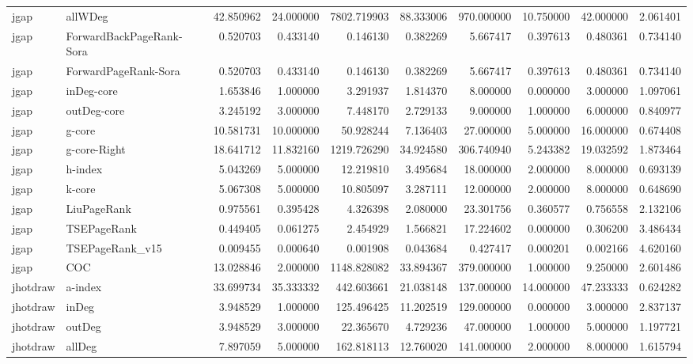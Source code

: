 \begin{tabular}{llrrrrrrrr}
jgap & allWDeg & 42.850962 & 24.000000 & 7802.719903 & 88.333006 & 970.000000 & 10.750000 & 42.000000 & 2.061401 \\
jgap & ForwardBackPageRank-Sora & 0.520703 & 0.433140 & 0.146130 & 0.382269 & 5.667417 & 0.397613 & 0.480361 & 0.734140 \\
jgap & ForwardPageRank-Sora & 0.520703 & 0.433140 & 0.146130 & 0.382269 & 5.667417 & 0.397613 & 0.480361 & 0.734140 \\
jgap & inDeg-core & 1.653846 & 1.000000 & 3.291937 & 1.814370 & 8.000000 & 0.000000 & 3.000000 & 1.097061 \\
jgap & outDeg-core & 3.245192 & 3.000000 & 7.448170 & 2.729133 & 9.000000 & 1.000000 & 6.000000 & 0.840977 \\
jgap & g-core & 10.581731 & 10.000000 & 50.928244 & 7.136403 & 27.000000 & 5.000000 & 16.000000 & 0.674408 \\
jgap & g-core-Right & 18.641712 & 11.832160 & 1219.726290 & 34.924580 & 306.740940 & 5.243382 & 19.032592 & 1.873464 \\
jgap & h-index & 5.043269 & 5.000000 & 12.219810 & 3.495684 & 18.000000 & 2.000000 & 8.000000 & 0.693139 \\
jgap & k-core & 5.067308 & 5.000000 & 10.805097 & 3.287111 & 12.000000 & 2.000000 & 8.000000 & 0.648690 \\
jgap & LiuPageRank & 0.975561 & 0.395428 & 4.326398 & 2.080000 & 23.301756 & 0.360577 & 0.756558 & 2.132106 \\
jgap & TSEPageRank & 0.449405 & 0.061275 & 2.454929 & 1.566821 & 17.224602 & 0.000000 & 0.306200 & 3.486434 \\
jgap & TSEPageRank_v15 & 0.009455 & 0.000640 & 0.001908 & 0.043684 & 0.427417 & 0.000201 & 0.002166 & 4.620160 \\
jgap & COC & 13.028846 & 2.000000 & 1148.828082 & 33.894367 & 379.000000 & 1.000000 & 9.250000 & 2.601486 \\
jhotdraw & a-index & 33.699734 & 35.333332 & 442.603661 & 21.038148 & 137.000000 & 14.000000 & 47.233333 & 0.624282 \\
jhotdraw & inDeg & 3.948529 & 1.000000 & 125.496425 & 11.202519 & 129.000000 & 0.000000 & 3.000000 & 2.837137 \\
jhotdraw & outDeg & 3.948529 & 3.000000 & 22.365670 & 4.729236 & 47.000000 & 1.000000 & 5.000000 & 1.197721 \\
jhotdraw & allDeg & 7.897059 & 5.000000 & 162.818113 & 12.760020 & 141.000000 & 2.000000 & 8.000000 & 1.615794 \\

\end{tabular}
